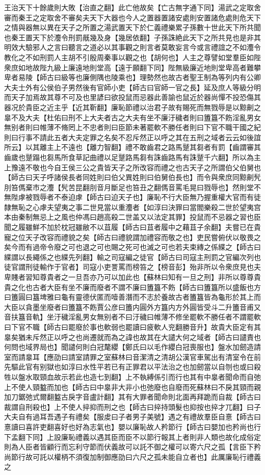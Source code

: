 王治天下十餘歲則大敗【治直之翻】此亡他故矣【亡古無字通下同】湯武之定取舍審而秦王之定取舍不審矣夫天下大器也今人之置器置諸安處則安置諸危處則危天下之情與器無以異在天子之所置之湯武置天下於仁義禮樂累子孫數十世此天下所共聞也秦王置天下於灋令刑罰旤幾及身【幾居依翻】子孫誅絶此天下之所共見也是非其明效大驗邪人之言曰聽言之道必以其事觀之則言者莫敢妄言今或言禮誼之不如灋令教化之不如刑罰人主胡不引殷周秦事以觀之也【胡何也】人主之尊譬如堂羣臣如陛衆庶如地故陛九級上廉遠地則堂高【遠于願翻下同】陛無級廉近地則堂卑高者難攀卑者易陵【師古曰級等也廉側隅也陵乘也】理勢然也故古者聖王制為等列内有公卿大夫士外有公侯伯子男然後有官師小吏【師古曰官師一官之長】延及庶人等級分明而天子加焉故其尊不可及也里諺曰欲投鼠而忌器此善諭也鼠近於器尚憚不投恐傷其器况於貴臣之近主乎【近其靳翻】廉恥節禮以治君子故有賜死而無戮辱是以黥劓之辠不及大夫【杜佑曰刑不上大夫者古之大夫有坐不廉汙穢者則曰簠簋不飭淫亂男女無别者則曰帷薄不脩罔上不忠者則曰臣節未著罷軟不勝任者則曰下官不職干國之紀則曰行事不請此五者大夫定罪之名矣不忍斥然正以呼之其在五刑之域者云云如後誼所云】以其離主上不遠也【離力智翻】禮不敢齒君之路馬蹵其芻者有罰【齒謂審其齒歲也蹵蹋也芻馬所食草記曲禮以足蹵路馬芻有誅齒路馬有誅蹵千六翻】所以為主上豫遠不敬也今自王侯三公之貴皆天子之所改容而禮之也古天子之所謂伯父伯舅也【師古曰天子呼諸侯長者同姓則曰伯父異姓則曰伯舅伯長也】而令與衆庶同黥劓髠刖笞傌棄市之灋【髠苦昆翻刖音月斷足也笞丑之翻傌音罵毛晃曰戮辱也】然則堂不無陛虖被戮辱者不泰迫虖【師古曰迫天子也】廉恥不行大臣無乃握重權大官而有徒隸無恥之心虖夫望夷之事二世見當以重灋者【如淳曰決罪曰當閻樂殺二世於望夷宫本由秦制無忌上之風也仲馮曰趙高殺二世盖又以法定其罪】投鼠而不忌器之習也臣聞之履雖鮮不加於枕冠雖敝不以苴履【師古曰苴者履中之藉苴子余翻】夫嘗已在貴寵之位天子改容而禮貌之矣【師古曰禮貌謂加禮容而敬之也】吏民嘗俯伏以敬畏之矣今而有過帝令廢之可也退之可也賜之死可也滅之可也若夫束縳之係緤之【師古曰緤謂以長繩係之也緤先列翻】輸之司寇編之徒官【師古曰司寇主刑罰之官編次列也徒官謂刑徒輸作于官者】司寇小吏詈罵而榜笞之【榜音彭】殆非所以令衆庶見也夫卑賤者習知尊貴者之一旦吾亦乃可以加此也【蘇林曰知有一旦之刑】非所以尊尊貴貴之化也古者大臣有坐不廉而廢者不謂不廉曰簠簋不飭【師古曰簠簋所以盛飯也方曰簠圓曰簋埤雅曰龜有靈德伏匿而噎善潛而不志於養故古者簠簋皆為龜形於其上而大臣以貪墨坐廢者曰簠簋不飭賈公彦曰簠内圓外方簋内方外圓皆受斗二升簠音甫又音扶簋音軌】坐汙穢淫亂男女無别者不曰汙穢曰帷薄不修坐罷軟不勝任者不謂罷軟曰下官不職【師古曰罷廢於事也軟弱也罷讀曰疲軟人兖翻勝音升】故貴大臣定有其辠矣猶未斥然正以呼之也尚遷就而為之諱也故其在大譴大何之域者【師古曰譴責也何問也域界局也】聞譴何則白冠氂纓【鄭氏曰以毛作纓白冠喪服也】盤水加劒造請室而請辠耳【應劭曰請室請罪之室蘇林曰音潔清之清胡公漢官車駕出有清室令在前先驅此官有别獄也如淳曰水性平若已有正罪君以平法治之也加劒當以自刎也或曰殺牲以盤水取頸血故示若此也造七到翻】上不執縛係引而行也其有中辠者聞命而自弛上不使人頸盭而加也【師古曰中辠非大非小也弛廢也自廢而死蘇林曰不戾其頸而親加刀鋸弛式爾翻盭古戾字音盧計翻】其有大罪者聞命則北面再拜跪而自裁【師古曰裁謂自刑殺也】上不使人捽抑而刑之也【師古曰捽持頭髮也抑按也捽才兀翻】曰子大夫自有過耳吾遇子有禮矣【服䖍曰子者男子美號】遇之有禮故羣臣自憙【師古曰憙讀曰喜許吏翻喜好也好為志氣也】嬰以廉恥故人矜節行【師古曰嬰加也矜尚也行下孟翻下同】上設廉恥禮義以遇其臣而臣不以節行報其上者則非人類也故化成俗定則為人臣者皆顧行而忘利守節而伏義故可以託不御之權可以寄六尺之孤【言臣下矜尚節行故可託以權柄不須復加制御應劭曰六尺之孤未能自立者也】此厲廉恥行禮義之
